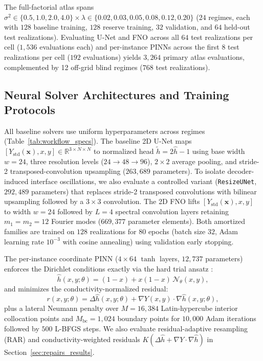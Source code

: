 \documentclass[preprint,12pt,authoryear]{elsarticle}
\begin{document}
The full-factorial atlas spans $\sigma^2 \in \{0.5, 1.0, 2.0, 4.0\} \times \lambda \in \{0.02, 0.03, 0.05, 0.08, 0.12, 0.20\}$ ($24$ regimes, each with $128$ baseline training, $128$ reserve training, $32$ validation, and $64$ held-out test realizations). Evaluating U-Net and FNO across all $64$ test realizations per cell ($1{,}536$ evaluations each) and per-instance PINNs across the first $8$ test realizations per cell ($192$ evaluations) yields $3{,}264$ primary atlas evaluations, complemented by 12 off-grid blind regimes ($768$ test realizations).

\subsection{Neural Solver Architectures and Training Protocols}
\label{sec:solvers}

All baseline solvers use uniform hyperparameters across regimes (Table~\ref{tab:workflow_specs}). The baseline 2D U-Net \citep{ronneberger2015unet} maps $[Y_{\text{std}}(\mathbf{x}), x, y] \in \mathbb{R}^{3 \times N \times N}$ to normalized head $\tilde{h} = 2\hat{h} - 1$ using base width $w = 24$, three resolution levels ($24 \to 48 \to 96$), $2 \times 2$ average pooling, and stride-2 transposed-convolution upsampling ($263{,}689$ parameters). To isolate decoder-induced interface oscillations, we also evaluate a controlled variant (\texttt{ResizeUNet}, $292{,}489$ parameters) that replaces stride-2 transposed convolutions with bilinear upsampling followed by a $3 \times 3$ convolution. The 2D FNO \citep{li2021fno} lifts $[Y_{\text{std}}(\mathbf{x}), x, y]$ to width $w = 24$ followed by $L = 4$ spectral convolution layers retaining $m_1 = m_2 = 12$ Fourier modes ($669{,}377$ parameter elements). Both amortized families are trained on $128$ realizations for $80$ epochs (batch size $32$, Adam learning rate $10^{-3}$ with cosine annealing) using validation early stopping.

The per-instance coordinate PINN \citep{raissi2019pinn} ($4 \times 64$ $\tanh$ layers, $12{,}737$ parameters) enforces the Dirichlet conditions exactly via the hard trial ansatz \citep{lu2021pinn}:
\begin{equation}
  \hat{h}(x, y; \theta) = (1 - x) + x(1 - x)\,\mathcal{N}_\theta(x, y),
  \label{eq:hard_bc}
\end{equation}
and minimizes the conductivity-normalized residual:
\begin{equation}
  r(x, y; \theta) = \Delta\hat{h}(x, y; \theta) + \nabla Y(x, y) \cdot \nabla\hat{h}(x, y; \theta),
  \label{eq:pinn_res}
\end{equation}
plus a lateral Neumann penalty over $M = 16{,}384$ Latin-hypercube interior collocation points and $M_{\text{bc}} = 1{,}024$ boundary points for $10{,}000$ Adam iterations followed by $500$ L-BFGS steps. We also evaluate residual-adaptive resampling (RAR) \citep{lu2021deepxde} and conductivity-weighted residuals $K(\Delta\hat{h} + \nabla Y \cdot \nabla\hat{h})$ in Section~\ref{sec:repairs_results}.
\end{document}
